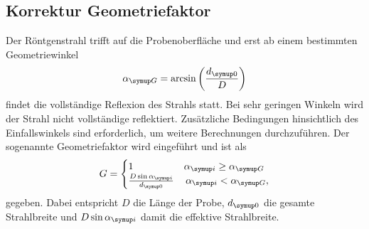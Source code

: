 \subsection{Korrektur Geometriefaktor}
Der Röntgenstrahl trifft auf die Probenoberfläche und erst ab einem bestimmten Geometriewinkel
\begin{equation*}
  \alpha\idx{G} = \mathrm{arcsin} \left ( \frac{d\idx{0}}{D} \right )
\end{equation*}
findet die vollständige Reflexion des Strahls statt. Bei sehr geringen Winkeln wird der Strahl nicht vollständige reflektiert.
Zusätzliche Bedingungen hinsichtlich des Einfallswinkels sind erforderlich, um weitere Berechnungen durchzuführen.
Der sogenannte Geometriefaktor wird eingeführt und ist als
\begin{equation*}
  G = 
\begin{cases}
1 & \alpha\idx{i} \geq \alpha\idx{G} \\
\frac{D \sin \alpha\idx{i}}{d\idx{0}} & \, \alpha\idx{i} < \alpha\idx{G}, \\
\end{cases}
\end{equation*}
gegeben. Dabei entspricht $D$ die Länge der Probe, $d\idx{0}$ die gesamte Strahlbreite und $D \sin \alpha\idx{i}$ damit die 
effektive Strahlbreite.
